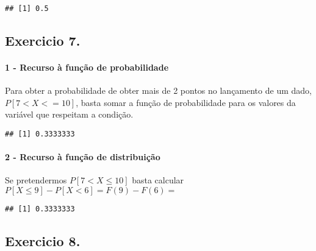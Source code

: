 \documentclass[
]{article}
\newenvironment{Shaded}{\begin{snugshade}}{\end{snugshade}}
\newcommand{\DecValTok}[1]{\textcolor[rgb]{0.00,0.00,0.81}{#1}}
\newcommand{\FunctionTok}[1]{\textcolor[rgb]{0.00,0.00,0.00}{#1}}
\newcommand{\NormalTok}[1]{#1}
\newcommand{\SpecialCharTok}[1]{\textcolor[rgb]{0.00,0.00,0.00}{#1}}
\begin{document}
\begin{verbatim}
## [1] 0.5
\end{verbatim}

\hypertarget{exercicio-7.}{%
\subsection{Exercicio 7.}\label{exercicio-7.}}

\hypertarget{recurso-uxe0-funuxe7uxe3o-de-probabilidade-1}{%
\paragraph{1 - Recurso à função de
probabilidade}\label{recurso-uxe0-funuxe7uxe3o-de-probabilidade-1}}

Para obter a probabilidade de obter mais de 2 pontos no lançamento de um
dado, \(P[7 < X <= 10]\), basta somar a função de probabilidade para os
valores da variável que respeitam a condição.

\begin{Shaded}
\end{Shaded}

\begin{verbatim}
## [1] 0.3333333
\end{verbatim}

\hypertarget{recurso-uxe0-funuxe7uxe3o-de-distribuiuxe7uxe3o-1}{%
\paragraph{2 - Recurso à função de
distribuição}\label{recurso-uxe0-funuxe7uxe3o-de-distribuiuxe7uxe3o-1}}

Se pretendermos \(P[7< X \le 10]\) basta calcular
\(P[X \le 9]-P[X < 6]=F(9)-F(6)=\)

\begin{verbatim}
## [1] 0.3333333
\end{verbatim}

\hypertarget{exercicio-8.}{%
\subsection{Exercicio 8.}\label{exercicio-8.}}
\end{document}
